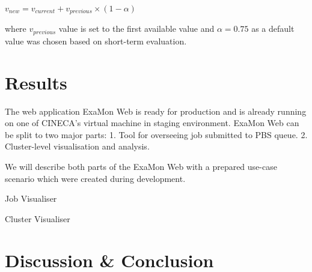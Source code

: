 \documentclass[a4paper, twoside]{article}
\newcommand{\highlight}[1]{\textcolor{prace-orange}{#1}}
\newcommand{\itempar}[1]{\noindent\highlight{\textsf #1}\par\noindent}
\begin{document}
\begin{multicols}{3}
$v_{new} = v_{current} + v_{previous} \times (1 - \alpha)$

\noindent where $v_{previous}$ value is set to the first available value and $\alpha = 0.75$ as a default value was chosen based on short-term evaluation.

\section*{Results}

The web application ExaMon Web is ready for production and is already running on one of CINECA's virtual machine in staging environment. ExaMon Web can be split to two major parts: 1. Tool for overseeing job submitted to PBS queue. 2. Cluster-level visualisation and analysis.

We will describe both parts of the ExaMon Web with a prepared use-case scenario which were created during development.

\itempar{Job Visualiser}

\itempar{Cluster Visualiser}

\section*{Discussion \& Conclusion}


%
%
%
%


\end{multicols}
\end{document}
